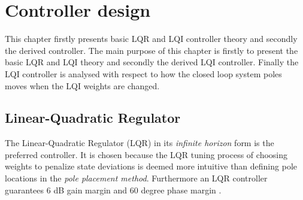 \section{Controller design} \label{sec:ctrl-design}
This chapter firstly presents basic LQR and LQI controller theory and secondly the derived controller. 
The main purpose of this chapter is firstly to present the basic LQR and LQI theory and secondly the derived LQI controller. Finally the LQI controller is analysed with respect to how the closed loop system poles moves when the LQI weights are changed.

\subsection{Linear-Quadratic Regulator} \label{sec:ctrl_lqr}
The Linear-Quadratic Regulator (LQR) in its \textit{infinite horizon} form is the preferred controller. It is chosen because the LQR tuning process of choosing weights to penalize state deviations is deemed more intuitive than defining pole locations in the \textit{pole placement method}. Furthermore an LQR controller guarantees 6 dB gain margin and 60 degree phase margin \cite{Doyle1978}. 

